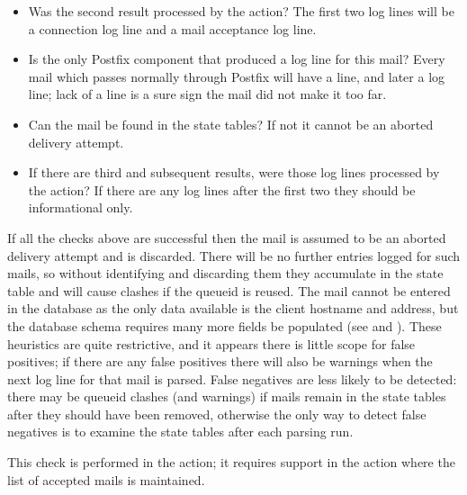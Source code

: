 \begin{itemize}

    \item Was the second result processed by the  action?
        The first two  log lines will be a connection log
        line and a mail acceptance log line.

    \item Is  the only Postfix component that produced a log
        line for this mail?  Every mail which passes normally through
        Postfix will have a  line, and later a
         log line; lack of a  line is a sure
        sign the mail did not make it too far.

    \item Can the mail be found in the state tables?  If not it cannot be
        an aborted delivery attempt.

    \item If there are third and subsequent results, were those log lines
        processed by the  action?  If there are any log
        lines after the first two they should be informational only.

\end{itemize}

If all the checks above are successful then the mail is assumed to be an
aborted delivery attempt and is discarded.  There will be no further
entries logged for such mails, so without identifying and discarding them
they accumulate in the state table and will cause clashes if the queueid is
reused.  The mail cannot be entered in the database as the only data
available is the client hostname and  address, but the database
schema requires many more fields be populated (see  and ).  These heuristics are quite
restrictive, and it appears there is little scope for false positives; if
there are any false positives there will also be warnings when the next log
line for that mail is parsed.  False negatives are less likely to be
detected: there may be queueid clashes (and warnings) if mails remain in
the state tables after they should have been removed, otherwise the only
way to detect false negatives is to examine the state tables after each
parsing run.

This check is performed in the  action; it requires
support in the  action where the list of accepted mails is
maintained.


